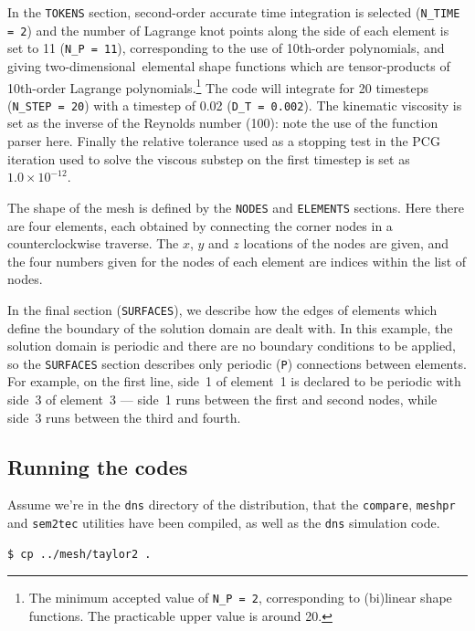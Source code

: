 \documentclass[11pt]{report}
\newcommand\twod{two-di\-men\-sion\-al}
\begin{document}
In the \texttt{TOKENS} section, second-order accurate time integration
is selected (\verb+N_TIME = 2+) and the number of Lagrange knot points
along the side of each element is set to 11 (\verb+N_P = 11+),
corresponding to the use of 10th-order polynomials, and giving
\twod\ elemental shape functions which are tensor-products of
10th-order Lagrange polynomials.\footnote{The minimum accepted value of
\texttt{N\_P = 2},
  corresponding to
  (bi)linear shape functions.  The practicable upper value is around 20.}
The code will integrate for 20 timesteps (\verb+N_STEP = 20+) with a
timestep of 0.02 (\verb+D_T = 0.002+).  The kinematic viscosity is set
as the inverse of the Reynolds number (100): note the use of the
function parser here.  Finally the relative tolerance used as a
stopping test in the PCG iteration used to solve the viscous substep
on the first timestep is set as $1.0\times10^{-12}$.

The shape of the mesh is defined by the \texttt{NODES} and
\texttt{ELEMENTS} sections.  Here there are four elements, each
obtained by connecting the corner nodes in a counterclockwise
traverse.  The $x$, $y$ and $z$ locations of the nodes are given, and
the four numbers given for the nodes of each element are indices
within the list of nodes.

In the final section (\texttt{SURFACES}), we describe how the edges of
elements which define the boundary of the solution domain are dealt
with.  In this example, the solution domain is periodic and there are
no boundary conditions to be applied, so the \texttt{SURFACES} section
describes only periodic (\verb+P+) connections between elements.  For
example, on the first line, side~1 of element~1 is declared to be
periodic with side~3 of element~3 --- side~1 runs between the first
and second nodes, while side~3 runs between the third and fourth.

\subsection{Running the codes}

Assume we're in the \texttt{dns} directory of the distribution, that
the \texttt{compare}, \texttt{meshpr} and
\texttt{sem2tec} utilities have been compiled, as well as the
\texttt{dns} simulation code.
{\small
\begin{verbatim}
$ cp ../mesh/taylor2 .
\end{verbatim}
}
\end{document}
